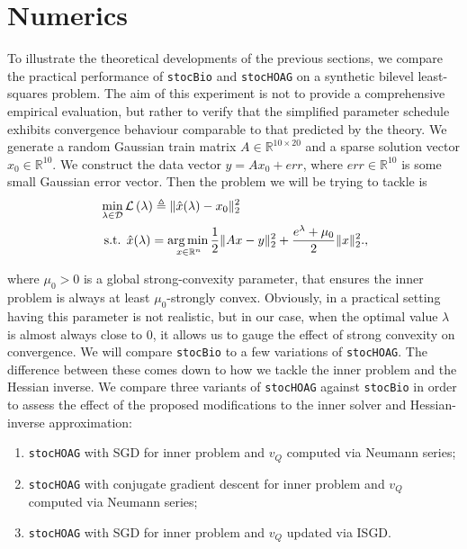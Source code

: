 \documentclass[11pt, twoside]{report}
\begin{document}
\section{Numerics} \label{sec:stoc_hoag_num}
To illustrate the theoretical developments of the previous sections, we compare the practical performance of \texttt{stocBio} and \texttt{stocHOAG} on a synthetic bilevel least-squares problem. The aim of this experiment is not to provide a comprehensive empirical evaluation, but rather to verify that the simplified parameter schedule exhibits convergence behaviour comparable to that predicted by the theory. We generate a random Gaussian train matrix $A \in \mathbb{R}^{10 \times 20}$ and a sparse solution vector $x_0 \in \mathbb{R}^{10}$. We construct the data vector $y = Ax_0 + err$, where $err \in \mathbb{R}^{10}$ is some small Gaussian error vector. Then the problem we will be trying to tackle is
\begin{align} 
&\min_{\lambda \in \mathcal{D}} \mathcal{L}\left(\lambda \right) \triangleq \|\hat{x}(\lambda) - x_0\|_2^2 \label{outer_hoag_test}\\
&\text { s.t. } \hat{x}(\lambda) =\underset{x \in \mathbb{R}^{n}} {\operatorname*{arg\, min \,}} \frac{1}{2}\|A x - y\|_2^2 + \frac{e^\lambda +\mu_0}{2}\|x\|_2^2. \label{inner_hoag_test},
\end{align}

where $\mu_0 > 0$ is a global strong-convexity parameter, that ensures the inner problem is always at least $\mu_0$-strongly convex. Obviously, in a practical setting having this parameter is not realistic, but in our case, when the optimal value $\lambda$ is almost always close to $0$, it allows us to gauge the effect of strong convexity on convergence. We will compare \texttt{stocBio} to a few variations of \texttt{stocHOAG}. The difference between these comes down to how we tackle the inner problem and the Hessian inverse. We compare three variants of \texttt{stocHOAG} against \texttt{stocBio} in order to assess the effect of the proposed modifications to the inner solver and Hessian-inverse approximation: 
\begin{enumerate}
    \item \texttt{stocHOAG} with SGD for inner problem and $v_Q$ computed via Neumann series;
    \item \texttt{stocHOAG} with conjugate gradient descent for inner problem and $v_Q$ computed via Neumann series;
    \item \texttt{stocHOAG} with SGD for inner problem and $v_Q$ updated via ISGD.
\end{enumerate}
\end{document}

